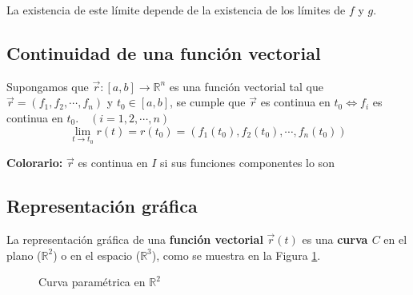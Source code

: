 La existencia de este límite depende de la existencia de los límites de $f$ y $g$.

\subsection{Continuidad de una función vectorial}

Supongamos que $\vec r:[a,b]\rightarrow \mathbb{R}^n$ es una función vectorial tal que $\vec r = (f_1,f_2,\cdots,f_n)$ y $t_0 \in [a,b]$, se cumple que $\vec r$ es continua en $t_0 \Leftrightarrow f_i$ es continua en $t_0. \quad (i=1,2,\cdots,n)$
$$
\lim_{t\to t_0}r(t) = r(t_0) = (f_1(t_0),f_2(t_0),\cdots,f_n(t_0))
$$

\textbf{Colorario:} $\vec r$ es continua en $I$ si sus funciones componentes lo son

\subsection{Representación gráfica}

La representación gráfica de una \textbf{función vectorial} $\vec r(t)$ es una \textbf{curva $C$} en el plano ($\mathbb{R}^2$) o en el espacio ($\mathbb{R}^3$), como se muestra en la Figura \ref{fig:curva_parametrica}.
\begin{figure}[ht]
  \centering
  \caption{Curva paramétrica en $\mathbb{R}^2$}
  \label{fig:curva_parametrica}
\end{figure}

